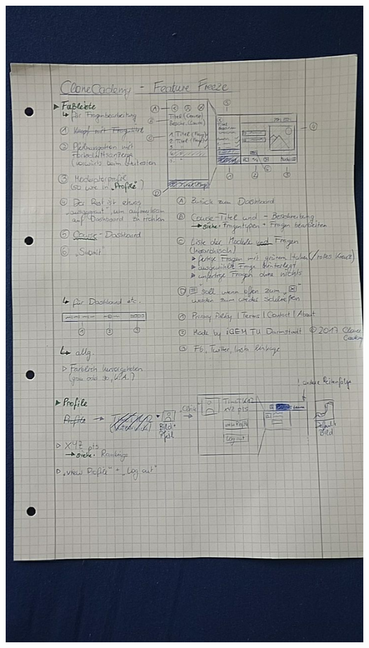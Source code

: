 \documentclass[accentcolor=tud0b,12pt,paper=a4]{tudreport}
\begin{document}
	\pagebreak
	
		\includegraphics[height=\textheight]{appendix/Protokolle/IMG_20170830_104101.jpg}
		
	\pagebreak
	
\end{document}
